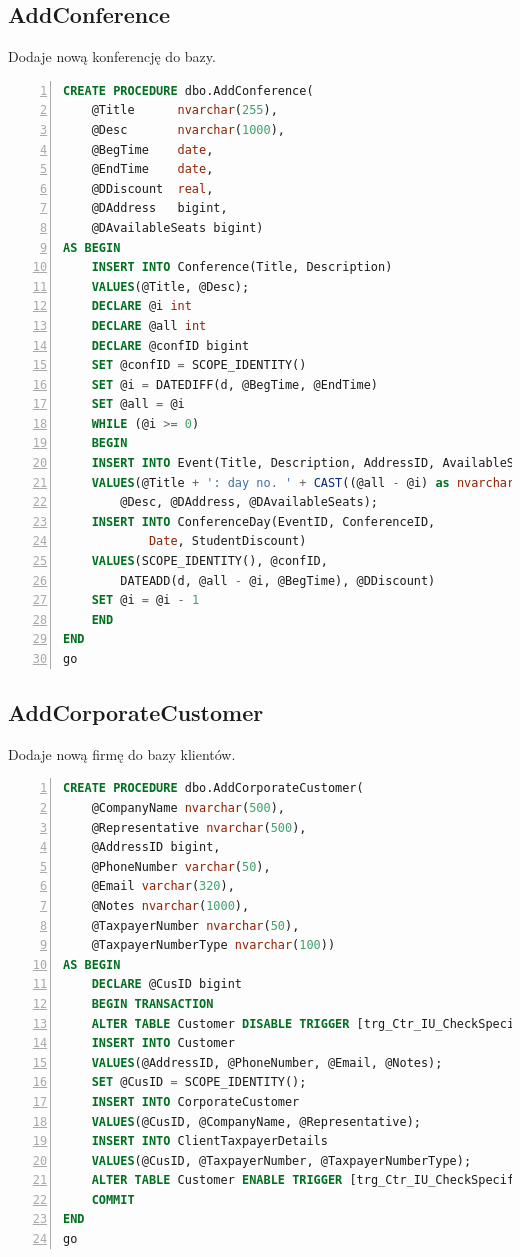 \documentclass[]{article}
\begin{document}
	\subsection{AddConference}
	Dodaje nową konferencję do bazy.
	\begin{lstlisting}[language=SQL,
						showspaces=false,
						basicstyle=\ttfamily,
						numbers=left,
						numberstyle=\tiny,
						backgroundcolor=\color{lightg},
						keywordstyle=\color{lightblue},
						commentstyle=\color{gray}]
CREATE PROCEDURE dbo.AddConference(
	@Title		nvarchar(255),
	@Desc		nvarchar(1000),
	@BegTime	date,
	@EndTime	date,
	@DDiscount	real,
	@DAddress	bigint,
	@DAvailableSeats bigint)
AS BEGIN
	INSERT INTO Conference(Title, Description)
	VALUES(@Title, @Desc);
	DECLARE @i int
	DECLARE @all int
	DECLARE @confID bigint
	SET @confID = SCOPE_IDENTITY()
	SET @i = DATEDIFF(d, @BegTime, @EndTime)
	SET @all = @i
	WHILE (@i >= 0)
	BEGIN
	INSERT INTO Event(Title, Description, AddressID, AvailableSeats)
	VALUES(@Title + ': day no. ' + CAST((@all - @i) as nvarchar),
		@Desc, @DAddress, @DAvailableSeats);
	INSERT INTO ConferenceDay(EventID, ConferenceID,
			Date, StudentDiscount)
	VALUES(SCOPE_IDENTITY(), @confID,
		DATEADD(d, @all - @i, @BegTime), @DDiscount)
	SET @i = @i - 1
	END
END
go
	\end{lstlisting}

	\subsection{AddCorporateCustomer}
	Dodaje nową firmę do bazy klientów.
	\begin{lstlisting}[language=SQL,
						showspaces=false,
						basicstyle=\ttfamily,
						numbers=left,
						numberstyle=\tiny,
						backgroundcolor=\color{lightg},
						keywordstyle=\color{lightblue},
						commentstyle=\color{gray}]
CREATE PROCEDURE dbo.AddCorporateCustomer(
	@CompanyName nvarchar(500),
	@Representative nvarchar(500),
	@AddressID bigint,
	@PhoneNumber varchar(50),
	@Email varchar(320),
	@Notes nvarchar(1000),
	@TaxpayerNumber nvarchar(50),
	@TaxpayerNumberType nvarchar(100))
AS BEGIN
	DECLARE @CusID bigint
	BEGIN TRANSACTION
	ALTER TABLE Customer DISABLE TRIGGER [trg_Ctr_IU_CheckSpecifiedType];
	INSERT INTO Customer
	VALUES(@AddressID, @PhoneNumber, @Email, @Notes);
	SET @CusID = SCOPE_IDENTITY();
	INSERT INTO CorporateCustomer
	VALUES(@CusID, @CompanyName, @Representative);
	INSERT INTO ClientTaxpayerDetails
	VALUES(@CusID, @TaxpayerNumber, @TaxpayerNumberType);
	ALTER TABLE Customer ENABLE TRIGGER [trg_Ctr_IU_CheckSpecifiedType];
	COMMIT
END
go
	\end{lstlisting}
	
\end{document}
